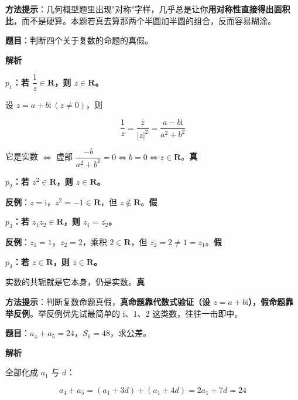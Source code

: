 
\begin{gktip}
\textbf{方法提示}：几何概型题里出现"对称"字样，几乎总是让你\textbf{用对称性直接得出面积比}，而不是硬算。本题若真去算那两个半圆加半圆的组合，反而容易糊涂。
\end{gktip}

\par\medskip


\textbf{题目}：判断四个关于复数的命题的真假。

\textbf{解析}

\textbf{$p_1$：若 $\dfrac1z\in\mathbf R$，则 $z\in\mathbf R$。}

设 $z=a+b\mathrm i\ (z\ne0)$，则

\[\frac1z=\frac{\bar z}{|z|^{2}}=\frac{a-b\mathrm i}{a^{2}+b^{2}}\]

它是实数 $\iff$ 虚部 $\dfrac{-b}{a^{2}+b^{2}}=0\iff b=0\iff z\in\mathbf R$。\textbf{真} 

\textbf{$p_2$：若 $z^{2}\in\mathbf R$，则 $z\in\mathbf R$。}

\textbf{反例}：$z=\mathrm i$，$z^{2}=-1\in\mathbf R$，但 $z\notin\mathbf R$。\textbf{假} 

\textbf{$p_3$：若 $z_1z_2\in\mathbf R$，则 $z_1=\overline{z_2}$。}

\textbf{反例}：$z_1=1$，$z_2=2$，乘积 $2\in\mathbf R$，但 $\overline{z_2}=2\ne1=z_1$。\textbf{假} 

\textbf{$p_4$：若 $z\in\mathbf R$，则 $\bar z\in\mathbf R$。}

实数的共轭就是它本身，仍是实数。\textbf{真} 


\begin{gktip}
\textbf{方法提示}：判断复数命题真假，\textbf{真命题靠代数式验证（设 $z=a+b\mathrm i$），假命题靠举反例}。举反例优先试最简单的 $\mathrm i$、$1$、$2$ 这类数，往往一击即中。
\end{gktip}

\par\medskip


\textbf{题目}：$a_4+a_5=24$，$S_6=48$，求公差。

\textbf{解析}

全部化成 $a_1$ 与 $d$：

\[a_4+a_5=\left(a_1+3d\right)+\left(a_1+4d\right)=2a_1+7d=24\]

